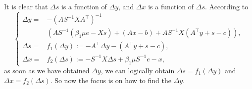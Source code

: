 It is clear that $\Delta s$ is a function of $\Delta y$, and $\Delta x$ is a function of $\Delta s$. According to 
\begin{equation}
\left\{
\begin{aligned}
\Delta y= 
& -\left(A S^{-1} X A^{\top}\right)^{-1} \\
& \left(A S^{-1}\left(\beta_1\mu e-X s\right)+\left(A x-b\right)+A S^{-1} X\left(A^{\top} y+s-c\right)\right), \\
\Delta s = &f_1(\Delta y) := -A^{\top} \Delta y-\left(A^{\top} y+s-c\right), \\
\Delta x = &f_2(\Delta s) := -S^{-1} X \Delta s+\beta_1\mu S^{-1} e-x,
\end{aligned}
\right.
\end{equation}
as soon as we have obtained $\Delta y$, we can logically obtain $\Delta s=f_1(\Delta y)$ and $\Delta x=f_2(\Delta s)$. So now the focus is on how to find the $\Delta y$.

